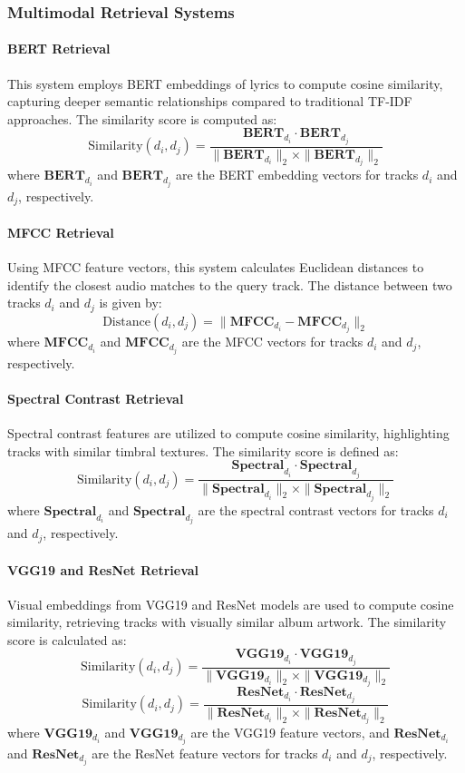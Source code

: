 \documentclass[sigconf]{acmart}
\begin{document}
\subsubsection{Multimodal Retrieval Systems}

\paragraph{BERT Retrieval}
This system employs BERT embeddings of lyrics to compute cosine similarity, capturing deeper semantic relationships compared to traditional TF-IDF approaches. The similarity score is computed as:
\[
\text{Similarity}(d_i, d_j) = \frac{\mathbf{BERT}_{d_i} \cdot \mathbf{BERT}_{d_j}}{\|\mathbf{BERT}_{d_i}\|_2 \times \|\mathbf{BERT}_{d_j}\|_2}
\]
where \( \mathbf{BERT}_{d_i} \) and \( \mathbf{BERT}_{d_j} \) are the BERT embedding vectors for tracks \( d_i \) and \( d_j \), respectively.

\paragraph{MFCC Retrieval}
Using MFCC feature vectors, this system calculates Euclidean distances to identify the closest audio matches to the query track. The distance between two tracks \( d_i \) and \( d_j \) is given by:
\[
\text{Distance}(d_i, d_j) = \|\mathbf{MFCC}_{d_i} - \mathbf{MFCC}_{d_j}\|_2
\]
where \( \mathbf{MFCC}_{d_i} \) and \( \mathbf{MFCC}_{d_j} \) are the MFCC vectors for tracks \( d_i \) and \( d_j \), respectively.

\paragraph{Spectral Contrast Retrieval}
Spectral contrast features are utilized to compute cosine similarity, highlighting tracks with similar timbral textures. The similarity score is defined as:
\[
\text{Similarity}(d_i, d_j) = \frac{\mathbf{Spectral}_{d_i} \cdot \mathbf{Spectral}_{d_j}}{\|\mathbf{Spectral}_{d_i}\|_2 \times \|\mathbf{Spectral}_{d_j}\|_2}
\]
where \( \mathbf{Spectral}_{d_i} \) and \( \mathbf{Spectral}_{d_j} \) are the spectral contrast vectors for tracks \( d_i \) and \( d_j \), respectively.

\paragraph{VGG19 and ResNet Retrieval}
Visual embeddings from VGG19 and ResNet models are used to compute cosine similarity, retrieving tracks with visually similar album artwork. The similarity score is calculated as:
\[
\text{Similarity}(d_i, d_j) = \frac{\mathbf{VGG19}_{d_i} \cdot \mathbf{VGG19}_{d_j}}{\|\mathbf{VGG19}_{d_i}\|_2 \times \|\mathbf{VGG19}_{d_j}\|_2}
\]
\[
\text{Similarity}(d_i, d_j) = \frac{\mathbf{ResNet}_{d_i} \cdot \mathbf{ResNet}_{d_j}}{\|\mathbf{ResNet}_{d_i}\|_2 \times \|\mathbf{ResNet}_{d_j}\|_2}
\]
where \( \mathbf{VGG19}_{d_i} \) and \( \mathbf{VGG19}_{d_j} \) are the VGG19 feature vectors, and \( \mathbf{ResNet}_{d_i} \) and \( \mathbf{ResNet}_{d_j} \) are the ResNet feature vectors for tracks \( d_i \) and \( d_j \), respectively.
\end{document}
